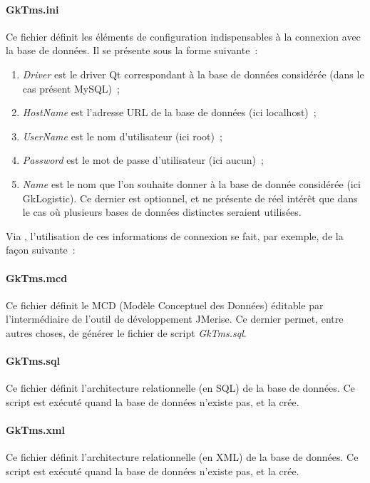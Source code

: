 \paragraph{GkTms.ini}
Ce fichier définit les éléments de configuration indispensables à la connexion avec la base de données.
Il se présente sous la forme suivante~:

\label{Database.properties}
\begin{enumerate}
	\item \emph{Driver} est le driver Qt correspondant à la base de données considérée (dans le cas présent MySQL)~;
	\item \emph{HostName} est l'adresse URL de la base de données (ici localhost)~;
	\item \emph{UserName} est le nom d'utilisateur (ici root)~;
	\item \emph{Password} est le mot de passe d'utilisateur (ici aucun)~;
	\item \emph{Name} est le nom que l'on souhaite donner à la base de donnée considérée (ici GkLogistic). Ce dernier est optionnel, et ne présente de réel intérêt que dans le cas où plusieurs bases de données distinctes seraient utilisées.
\end{enumerate}
Via \Qt, l'utilisation de ces informations de connexion se fait, par exemple, de la façon suivante~:

\paragraph{GkTms.mcd}
Ce fichier définit le MCD (Modèle Conceptuel des Données) éditable par l'intermédiaire de l'outil de développement JMerise.
Ce dernier permet, entre autres choses, de générer le fichier de script \emph{GkTms.sql}.

\paragraph{GkTms.sql}
Ce fichier définit l'architecture relationnelle (en SQL) de la base de données.
Ce script est exécuté quand la base de données n'existe pas, et la crée.

\paragraph{GkTms.xml}
Ce fichier définit l'architecture relationnelle (en XML) de la base de données.
Ce script est exécuté quand la base de données n'existe pas, et la crée.

